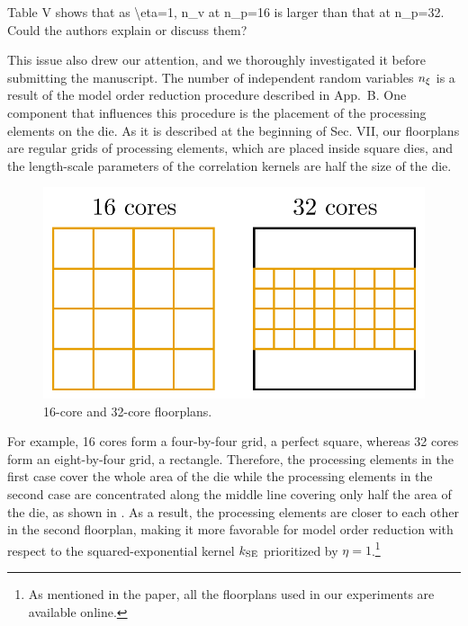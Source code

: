 \begin{reviewer}
Table V shows that as \textbackslash{}eta=1, n\_v at n\_p=16 is larger than that at n\_p=32. Could the authors explain or discuss them?
\end{reviewer}
\begin{authors}
This issue also drew our attention, and we thoroughly investigated it before submitting the manuscript.
The number of independent random variables ${n_\xi}$ is a result of the model order reduction procedure described in App.~B.
One component that influences this procedure is the placement of the processing elements on the die.
As it is described at the beginning of Sec. VII, our floorplans are regular grids of processing elements, which are placed inside square dies, and the length-scale parameters of the correlation kernels are half the size of the die.
\begin{figure}[h!]
  \centering
  \includegraphics[width=0.3\linewidth]{include/revision/floorplans.pdf}
  \caption{16-core and 32-core floorplans.}
\end{figure}
For example, 16 cores form a four-by-four grid, a perfect square, whereas 32 cores form an eight-by-four grid, a rectangle.
Therefore, the processing elements in the first case cover the whole area of the die while the processing elements in the second case are concentrated along the middle line covering only half the area of the die, as shown in .
As a result, the processing elements are closer to each other in the second floorplan, making it more favorable for model order reduction with respect to the squared-exponential kernel $k_{\text{SE}}$ prioritized by $\eta = 1$.\footnote{As mentioned in the paper, all the floorplans used in our experiments are available online.}

\begin{actions}
\end{actions}
\end{authors}

